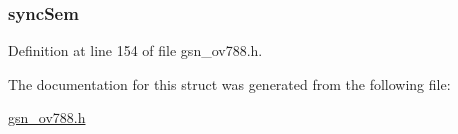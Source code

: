 \hypertarget{a00179_a79fd8ca5c0b5ff111ca7bf3d5caa9572}{
\subsubsection[{syncSem}]{ {\bf syncSem}}}
\label{a00179_a79fd8ca5c0b5ff111ca7bf3d5caa9572}


Definition at line 154 of file gsn\_\-ov788.h.



The documentation for this struct was generated from the following file:\begin{DoxyCompactItemize}
\item 
\hyperlink{a00537}{gsn\_\-ov788.h}\end{DoxyCompactItemize}
